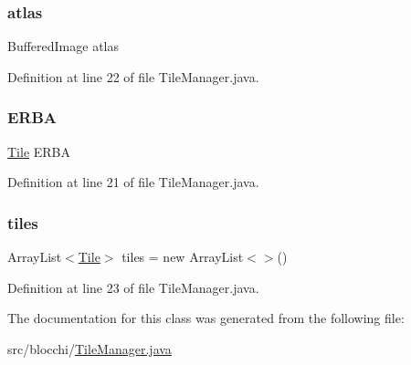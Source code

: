 \subsubsection{\texorpdfstring{atlas}{atlas}}
{\footnotesize\ttfamily Buffered\+Image atlas}



Definition at line 22 of file Tile\+Manager.\+java.

\mbox{\label{classblocchi_1_1_tile_manager_a976f8123c1fc10e66de7e7f98570d45a}} 
\subsubsection{\texorpdfstring{E\+R\+BA}{ERBA}}
{\footnotesize\ttfamily \hyperlink{classblocchi_1_1_tile}{Tile} E\+R\+BA}



Definition at line 21 of file Tile\+Manager.\+java.

\mbox{\label{classblocchi_1_1_tile_manager_a4b6ed1e7aa1fffacfc6271483b48c304}} 
\subsubsection{\texorpdfstring{tiles}{tiles}}
{\footnotesize\ttfamily Array\+List$<$\hyperlink{classblocchi_1_1_tile}{Tile}$>$ tiles = new Array\+List$<$$>$()}



Definition at line 23 of file Tile\+Manager.\+java.



The documentation for this class was generated from the following file\+:\begin{DoxyCompactItemize}
\item 
src/blocchi/\hyperlink{_tile_manager_8java}{Tile\+Manager.\+java}\end{DoxyCompactItemize}
